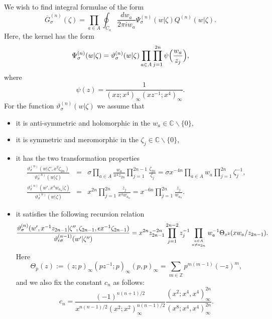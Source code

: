 \documentclass[a4paper,10pt]{article}
\begin{document}
We wish to find integral formulae of the form 
\begin{equation}
\overline{G}_{\sigma}^{(n)} 
(\zeta)=\prod_{a\in A}\oint_{C_a} 
\dfrac{dw_a}{2\pi iw_a} 
\Psi_{\sigma}^{(n)} (w|\zeta )
Q^{(n)}(w|\zeta). 
\label{eq:G-form}
\end{equation}
Here, the kernel has the form 
\begin{equation}
\Psi^{(n)}_\sigma (w| \zeta )=
\vartheta^{(n)}_\sigma (w | \zeta )
\prod_{a\in A}\prod_{j=1}^{2n} 
\psi \Bigl(\frac{w_{a}}{z_j}\Bigr),
\label{eq:df-Psi}
\end{equation}
where
\begin{equation}
\psi(z)=\frac{1}{(xz;x^4)_{\infty}
(xz^{-1};x^4)_{\infty}}. 
\label{eq:df-psi}
\end{equation}
For the function 
$\vartheta^{(n)}_\sigma(w|\zeta )$ 
we assume that
\begin{itemize}
\item
it is anti-symmetric and holomorphic
in the $w_a \in \mathbb{C} \backslash \{0\}$,
 
\item
it is symmetric and meromorphic
in the $\zeta_j\in \mathbb{C} \backslash \{0\}$,
 
\item
it has the two transformation properties 
\begin{eqnarray}
\displaystyle\frac
{\vartheta^{(n)}_\sigma (w |\zeta', x^2 \zeta_{2n})}
{\vartheta^{(n)}_\sigma (w | \zeta )}&=& 
\sigma \displaystyle\prod_{a\in A}
\frac{w_{a}}{x^4 z_{2n}} 
\prod_{j=1}^{2n-1} \frac{\zeta_{2n}}{\zeta_j}=
\sigma x^{-4n} \displaystyle\prod_{a\in A}w_{a}
\prod_{j=1}^{2n}\zeta_j^{-1}, 
\label{eq:z-sym}\\
\displaystyle \frac
{\vartheta^{(n)}_\sigma (w', x^4 w_{a_n}| \zeta )}
{\vartheta^{(n)}_\sigma (w | \zeta )}
&=& x^{2n}\displaystyle\prod_{j=1}^{2n} 
\frac{z_j }{x^4 w_{a_n}}=x^{-6n}
\displaystyle\prod_{j=1}^{2n} \frac{z_j }{w_{a_n}}.
\label{eq:x-sym}
\end{eqnarray}
\item it satisfies the following recursion relation
\begin{equation}
\displaystyle \frac{\vartheta_{\sigma}^{(n)}
(w', x^{-1}z_{2n-1} |\zeta'',\zeta_{2n-1}, 
\epsilon x^{-1} \zeta_{2n-1})}
{\vartheta_{\epsilon\sigma}^{(n-1)}(w' |\zeta'')}=
\displaystyle x^{2n}z_{2n-1}^{-2n}\prod_{j=1}^{2n-2} 
z_j^{-1} \prod_{a\in A\atop a\neq a_{2n}}w_a^{-1} 
\Theta_{x^2}(x w_{a}/z_{2n-1}). 
\label{eq:th-rec}
\end{equation}
Here 
$$
\Theta_{p}(z):=(z; p)_\infty 
(pz^{-1}; p)_\infty (p, p)_\infty =
\sum_{m\in\mathbb{Z}} p^{m(m-1)}(-z)^m , 
$$
and we also fix the constant $c_n$ as follows: 
\begin{equation}
c_n =\frac{(-1)^{n(n+1)/2}}{x^{n(n-1)/2}
(x^2 ; x^2 )_\infty^{n(n-1)/2}}\frac{
(x^2 ; x^4 , x^4 )_\infty^{2n}}{
(x^8 ; x^4 , x^4 )_\infty^{2n}}. 
\label{eq:c_n}
\end{equation}
\end{itemize}
\end{document}
